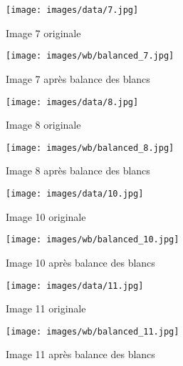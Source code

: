 \documentclass[12pt]{article}
\begin{document}
\begin{figure}[H]
    \centering
    \begin{minipage}{0.48\textwidth}
        \centering
        \texttt{[image: images/data/7.jpg]}
        \caption{Image 7 originale}
    \end{minipage}
    \hfill
    \begin{minipage}{0.48\textwidth}
        \centering
        \texttt{[image: images/wb/balanced\_7.jpg]}
        \caption{Image 7 après balance des blancs}
    \end{minipage}
\end{figure}

\begin{figure}[H]
    \centering
    \begin{minipage}{0.48\textwidth}
        \centering
        \texttt{[image: images/data/8.jpg]}
        \caption{Image 8 originale}
    \end{minipage}
    \hfill
    \begin{minipage}{0.48\textwidth}
        \centering
        \texttt{[image: images/wb/balanced\_8.jpg]}
        \caption{Image 8 après balance des blancs}
    \end{minipage}
\end{figure}

\begin{figure}[H]
    \centering
    \begin{minipage}{0.48\textwidth}
        \centering
        \texttt{[image: images/data/10.jpg]}
        \caption{Image 10 originale}
    \end{minipage}
    \hfill
    \begin{minipage}{0.48\textwidth}
        \centering
        \texttt{[image: images/wb/balanced\_10.jpg]}
        \caption{Image 10 après balance des blancs}
    \end{minipage}
\end{figure}

\begin{figure}[H]
    \centering
    \begin{minipage}{0.48\textwidth}
        \centering
        \texttt{[image: images/data/11.jpg]}
        \caption{Image 11 originale}
    \end{minipage}
    \hfill
    \begin{minipage}{0.48\textwidth}
        \centering
        \texttt{[image: images/wb/balanced\_11.jpg]}
        \caption{Image 11 après balance des blancs}
    \end{minipage}
\end{figure}
\end{document}
